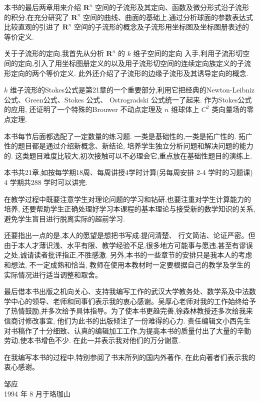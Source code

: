 本书的最后两章用来介绍 \({\mathbf{R}}^{n}\) 空间的子流形及其定向、函数及微分形式沿子流形的积分,在充分研究了 \({\mathbf{R}}^{n}\) 空间的曲线、曲面的基础上,通过分析球面的参数表达式比较直观的引进了 \({\mathbf{R}}^{n}\) 空间的子流形的概念及子流形用坐标图及坐标图册表述的等价定义.

关于子流形的定向,我首先从分析 \({\mathbf{R}}^{n}\) 的 \(k\) 维子空间的定向 入手,利用子流形切空间的定向,引入了用坐标图册定义的以及用子流形切空间的连续定向族定义的子流形定向的两个等价定义. 此外还介绍了子流形的边缘子流形及其诱导定向的概念.

\(k\) 维子流形的Stokes公式是第21章的一个重要部分,利用它把经典的Newton-Leibniz公式、Green公式、Stokes 公式、 Ostrogradski 公式统一了起来. 作为Stokes公式的应用, 还证明了一个特殊的Brouwer 不动点定理及 \(n\) 维球体上 \({C}^{2}\) 类向量场的零点定理.

本书每节后面都选配了一定数量的练习题. 一类是基础性的,一类是拓广性的. 拓广性的题目都是通过介绍新概念、新结论, 培养学生独立分析问题和解决问题的能力的. 这类题目难度比较大,初次接触可以不必理会它,重点放在基础性题目的演练上.

本书共21章,如按每学期18周、每周讲授4学时计算(另每周安排 2-4 学时的习题课) 4 学期共288 学时可以讲完.

在教学过程中既要注意学生对理论问题的学习和钻研,也要注重对学生计算能力的培养, 还要帮助学生正确处理好学习本课程的基本理论与接受新的数学知识的关系,避免学生盲目进行脱离实际的超前学习.

还要指出一点的是,本人的愿望是想把书写成:提问清楚、 行文简洁、论证严密。但由于本人才薄识浅、水平有限、教学经验不足,很多地方可能事与愿违,甚至有谬误之处,诚请读者批评指正,不胜感激. 另外,本书的一些章节的安排只是我本人的考虑和想法, 不一定成熟和恰当, 教师在使用本教材时一定要根据自己的教学及学生的实际情况进行适当调整和取舍。

最后借本书出版之机向关心、支持我编写工作的武汉大学教务处、数学系及中法数学中心的领导、老师和同事们表示我的衷心感谢。吴厚心老师对我的工作始终给予了热情鼓励,并多次给予具体指导。为了使本书更趋完善,徐森林教授还多次给我来信商讨修改事宜, 他们为此书的出版倾注了一份难得的心力. 责任编辑文小西先生对书稿作了十分细致、认真的编辑加工工作,为提高本书的质量付出了大量的辛勤劳动,使本书增色不少. 在此一并表示我对他们的万分谢意.

在我编写本书的过程中,特别参阅了书末所列的国内外著作, 在此向著者们表示我的衷心感谢。



\begin{flushright}
	邹应\\
	1994 年 8 月于珞珈山
\end{flushright}


